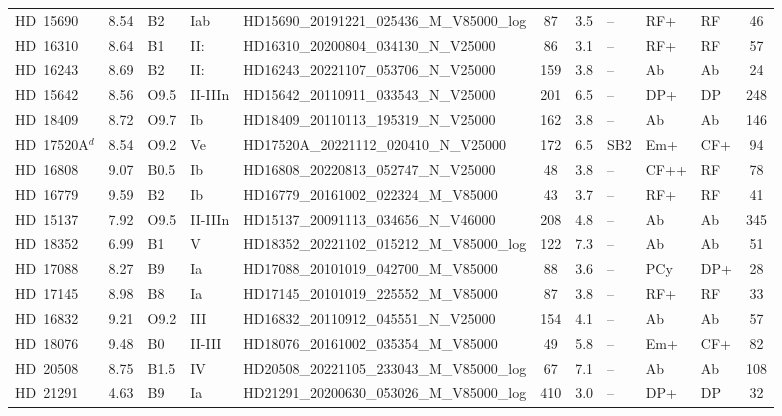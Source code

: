 {\begin{landscape}
\begin{longtable}{lclllcclllc}
\noalign{\smallskip}
HD~15690 & 8.54 & B2 & Iab & HD15690\_20191221\_025436\_M\_V85000\_log & 87 & 3.5 & -- & RF+ & RF & 46 \\
\noalign{\smallskip}
HD~16310 & 8.64 & B1 & II: & HD16310\_20200804\_034130\_N\_V25000 & 86 & 3.1 & -- & RF+ & RF & 57 \\
\noalign{\smallskip}
HD~16243 & 8.69 & B2 & II: & HD16243\_20221107\_053706\_N\_V25000 & 159 & 3.8 & -- & Ab & Ab & 24 \\
\noalign{\smallskip}
HD~15642 & 8.56 & O9.5 & II-IIIn & HD15642\_20110911\_033543\_N\_V25000 & 201 & 6.5 & -- & DP+ & DP & 248 \\
\noalign{\smallskip}
HD~18409 & 8.72 & O9.7 & Ib & HD18409\_20110113\_195319\_N\_V25000 & 162 & 3.8 & -- & Ab & Ab & 146 \\
\noalign{\smallskip}
HD~17520A$^{d}$ & 8.54 & O9.2 & Ve & HD17520A\_20221112\_020410\_N\_V25000 & 172 & 6.5 & SB2 & Em+ & CF+ & 94 \\
\noalign{\smallskip}
HD~16808 & 9.07 & B0.5 & Ib & HD16808\_20220813\_052747\_N\_V25000 & 48 & 3.8 & -- & CF++ & RF & 78 \\
\noalign{\smallskip}
HD~16779 & 9.59 & B2 & Ib & HD16779\_20161002\_022324\_M\_V85000 & 43 & 3.7 & -- & RF+ & RF & 41 \\
\noalign{\smallskip}
HD~15137 & 7.92 & O9.5 & II-IIIn & HD15137\_20091113\_034656\_N\_V46000 & 208 & 4.8 & -- & Ab & Ab & 345 \\
\noalign{\smallskip}
HD~18352 & 6.99 & B1 & V & HD18352\_20221102\_015212\_M\_V85000\_log & 122 & 7.3 & -- & Ab & Ab & 51 \\
\noalign{\smallskip}
HD~17088 & 8.27 & B9 & Ia & HD17088\_20101019\_042700\_M\_V85000 & 88 & 3.6 & -- & PCy & DP+ & 28 \\
\noalign{\smallskip}
HD~17145 & 8.98 & B8 & Ia & HD17145\_20101019\_225552\_M\_V85000 & 87 & 3.8 & -- & RF+ & RF & 33 \\
\noalign{\smallskip}
HD~16832 & 9.21 & O9.2 & III & HD16832\_20110912\_045551\_N\_V25000 & 154 & 4.1 & -- & Ab & Ab & 57 \\
\noalign{\smallskip}
HD~18076 & 9.48 & B0 & II-III & HD18076\_20161002\_035354\_M\_V85000 & 49 & 5.8 & -- & Em+ & CF+ & 82 \\
\noalign{\smallskip}
HD~20508 & 8.75 & B1.5 & IV & HD20508\_20221105\_233043\_M\_V85000\_log & 67 & 7.1 & -- & Ab & Ab & 108 \\
\noalign{\smallskip}
HD~21291 & 4.63 & B9 & Ia & HD21291\_20200630\_053026\_M\_V85000\_log & 410 & 3.0 & -- & DP+ & DP & 32 \\

\end{longtable}
\end{landscape}}
